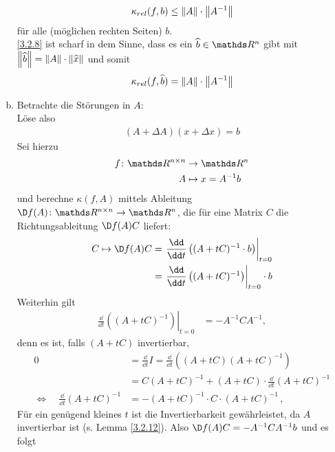 \begin{Bspe}
\begin{enumerate}[a)]
    \begin{gather}
      \kappa_{rel}(f,b) \leq \left\| A \right\| \cdot \left\| A^{-1} \right\| \label{III.2.8}
    \end{gather}
    für alle (möglichen rechten Seiten) $b $.\\
    \ref{3.2.8} ist scharf in dem Sinne, dass es ein $\widehat{b}\in \R^n$ gibt 
    mit $\left\| \widehat{b} \right\| = \left\| A \right\|\cdot \left\| \widehat{x} \right\|$ und somit
    \begin{gather*}
      \kappa_{rel}(f,\widehat{b}) = \left\| A \right\|\cdot \left\|  A^{-1} \right\|
    \end{gather*}
  \item Betrachte die Störungen in $A$:\\
    Löse also 
    \begin{gather*}
      (A+\Delta A)(x+\Delta x) = b
    \end{gather*}
    Sei hierzu
    \begin{align*}
      f\colon \R^{n\times n}&\to\R^n\\
      A&\mapsto x= A^{-1}b 
    \end{align*}
    und berechne $\kappa(f,A)$ mittels Ableitung
    $\D f(A)\colon\R^{n\times n}\to \R^n$, die für eine Matrix $C$ 
    die Richtungsableitung $\D f(A)C$ liefert:
    \begin{align*}
      C\mapsto \D f(A) C
      &=  \left.
        \frac{\dd}{\dd t}\left((A+tC)^{-1} \cdot b\right)
        \right|_{t=0} \\
      & = \left.
        \frac{\dd}{\dd t}\left((A+tC)^{-1}\right)
        \right|_{t=0}\cdot b
    \end{align*}			
    Weiterhin gilt
    \begin{align}
      \left. \frac{\dd}{\dd t} \left((A+tC)^{-1}\right) \right|_{t=0} 
      &=-A^{-1}CA^{-1},
        \label{III.2.9}
    \end{align}
    denn es ist, falls $(A+tC)$ invertierbar,
    \begin{align*}
      0 &= \frac{\dd}{\dd t}I
          = \frac{\dd}{\dd t}\left( (A+tC)(A+tC)^{-1}\right)\\
        &= C(A+tC)^{-1} +(A+tC)\cdot \frac{\dd}{\dd t}(A+tC)^{-1} \\
      \Longleftrightarrow\quad \frac{\dd}{\dd t} (A+ tC)^{-1} 
        &= -(A+tC)^{-1} \cdot C\cdot (A+tC)^{-1} \, ,
    \end{align*}
    Für ein genügend kleines $t$ ist die Invertierbarkeit
    gewährleistet, da $A$ invertierbar ist (s. Lemma \ref{3.2.12}).
    Also $\D f(A) C = -A^{-1}CA^{-1}b$ und es folgt

\end{enumerate}
\end{Bspe}
